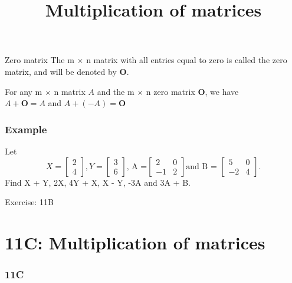 \documentclass[
	11pt, %
]{beamer}
\begin{document}
\begin{frame}{Zero matrix}
    The m $\times$ n matrix with all entries equal to zero is called the zero matrix, and will be
    denoted by \textbf{O}.\\
    \begin{block}{}
        For any m $\times$ n matrix $A$ and the m $\times$ n zero matrix \textbf{O}, we have\\
    $A + \textbf{O} = A$ and $A + (-A) = \textbf{O}$
    \end{block}
\end{frame}

\begin{frame}[t]
    \frametitle{Example}
    Let 
    \[
        X = 
    \begin{bmatrix}
        2\\
        4
    \end{bmatrix}
    , Y =
    \begin{bmatrix}
        3\\
        6
    \end{bmatrix}
    \text{, A =} 
    \begin{bmatrix}
        2 & 0\\
        -1 & 2
    \end{bmatrix}
    \text{and B = }
    \begin{bmatrix}
        5 & 0\\
        -2 & 4
    \end{bmatrix}
    .
    \]
    Find X + Y, 2X, 4Y + X, X - Y, -3A and 3A + B.
\end{frame}

\begin{frame}
\end{frame}
\begin{frame}{Exercise: 11B}
\end{frame}
\section{11C: Multiplication of matrices}
\begin{frame}
    \frametitle{11C}
    \begin{center}
        \title{Multiplication of matrices}
        \maketitle
    \end{center}
\end{frame}
\end{document}
